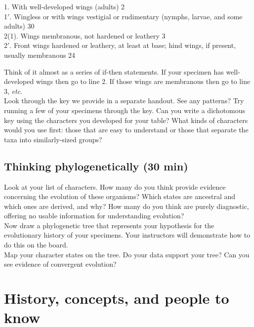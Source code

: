 \documentclass[letterpaper, 11pt]{article}
\begin{document}
\begin{adjustwidth}{1cm}{}
1. With well-developed wings (adults) \dotfill{} 2\\
1$'$. Wingless or with wings vestigial or rudimentary (nymphs, larvae, and some adults) \dotfill{} 30\\

\noindent{}2(1). Wings membranous, not hardened or leathery \dotfill{} 3\\
2$'$. Front wings hardened or leathery, at least at base; hind wings, if present, usually membranous \dotfill{}24\\
\end{adjustwidth}

\noindent{}Think of it almost as a series of if-then statements. If your specimen has well-developed wings then go to line 2. If those wings are membranous then go to line 3, \textit{etc}.\\

\noindent{}Look through the key we provide in a separate handout. See any patterns? Try running a few of your specimens through the key. Can you write a dichotomous key using the characters you developed for your table? What kinds of characters would you use first: those that are easy to understand or those that separate the taxa into similarly-sized groups?\vspace{14cm}

\subsection{Thinking phylogenetically (30 min)}
Look at your list of characters. How many do you think provide evidence concerning the evolution of these organisms? Which states are ancestral and which ones are derived, and why? How many do you think are purely diagnostic, offering no usable information for understanding evolution?\\

\noindent{}Now draw a phylogenetic tree that represents your hypothesis for the evolutionary history of your specimens. Your instructors will demonstrate how to do this on the board.\\

\noindent{}Map your character states on the tree. Do your data support your tree? Can you see evidence of convergent evolution?\\

\section{History, concepts, and people to know}
\end{document}
